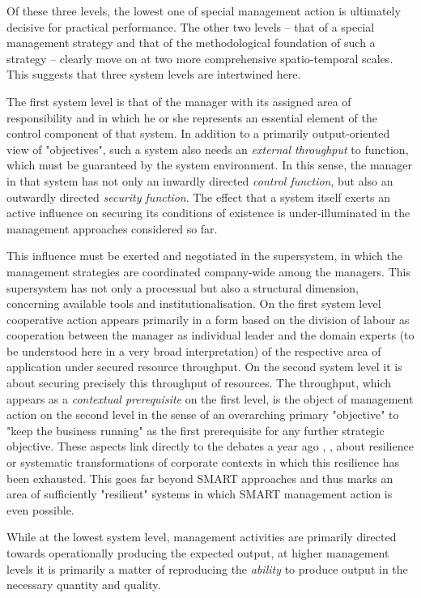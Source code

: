 \documentclass[11pt,a4paper]{article}
\begin{document}
Of these three levels, the lowest one of special management action is
ultimately decisive for practical performance. The other two levels -- that of
a special management strategy and that of the methodological foundation of
such a strategy -- clearly move on at two more comprehensive spatio-temporal
scales. This suggests that three system levels are intertwined here.

The first system level is that of the manager with its assigned area of
responsibility and in which he or she represents an essential element of the
control component of that system. In addition to a primarily output-oriented
view of "objectives", such a system also needs an \emph{external throughput}
to function, which must be guaranteed by the system environment. In this
sense, the manager in that system has not only an inwardly directed
\emph{control function}, but also an outwardly directed \emph{security
  function}.  The effect that a system itself exerts an active influence on
securing its conditions of existence is under-illuminated in the management
approaches considered so far.

This influence must be exerted and negotiated in the supersystem, in which the
management strategies are coordinated company-wide among the managers. This
supersystem has not only a processual but also a structural dimension,
concerning available tools and institutionalisation. On the first system level
cooperative action appears primarily in a form based on the division of labour
as cooperation between the manager as individual leader and the domain experts
(to be understood here in a very broad interpretation) of the respective area
of application under secured resource throughput. On the second system level
it is about securing precisely this throughput of resources. The throughput,
which appears as a \emph{contextual prerequisite} on the first level, is the
object of management action on the second level in the sense of an overarching
primary "objective" to "keep the business running" as the first prerequisite
for any further strategic objective. These aspects link directly to the
debates a year ago \cite{Graebe2020}, \cite{Holling2001}, \cite{Foxon2009}
about resilience or systematic transformations of corporate contexts in which
this resilience has been exhausted. This goes far beyond SMART approaches and
thus marks an area of sufficiently "resilient" systems in which SMART
management action is even possible.

While at the lowest system level, management activities are primarily directed
towards operationally producing the expected output, at higher management
levels it is primarily a matter of reproducing the \emph{ability} to produce
output in the necessary quantity and quality.
\enlargethispage{1em}
\end{document}
